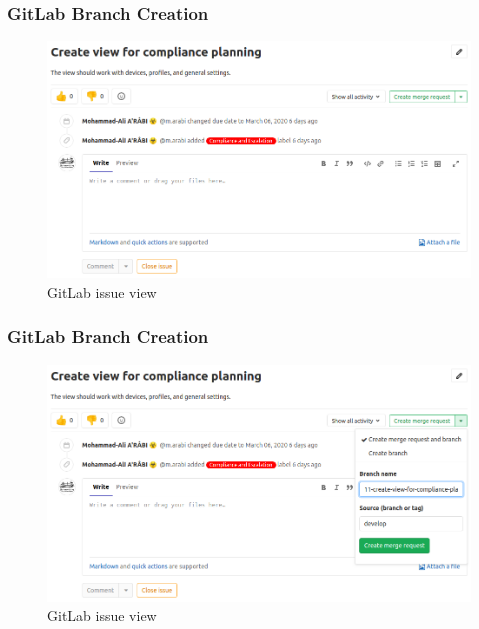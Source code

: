 \documentclass[10pt, compress]{beamer}
\begin{document}
\begin{frame}[fragile]
  \frametitle{GitLab Branch Creation}
  
  \begin{figure}
      \centering
      \includegraphics[scale=0.3]{images/gitlab-branch-1.png}
      \caption{GitLab issue view}
      \label{fig:gitlab1}
  \end{figure}

\end{frame}

\begin{frame}[fragile]
  \frametitle{GitLab Branch Creation}
  
  \begin{figure}
      \centering
      \includegraphics[scale=0.3]{images/gitlab-branch-2.png}
      \caption{GitLab issue view}
      \label{fig:gitlab2}
  \end{figure}

\end{frame}
\end{document}
